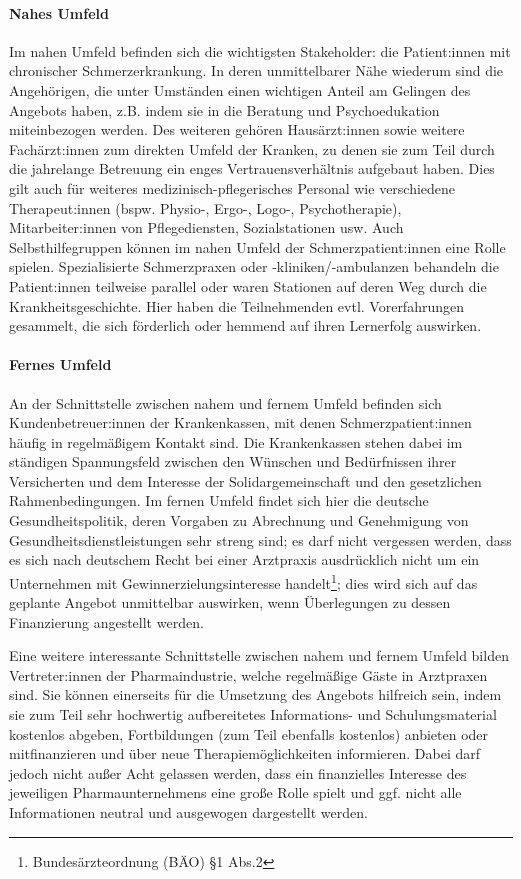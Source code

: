 \documentclass[
  twoside,
  parskip=half-,
]{scrreprt}
\begin{document}
\begin{praxis}
\paragraph{Nahes Umfeld} Im nahen Umfeld befinden sich die wichtigsten Stakeholder: die Patient:innen mit chronischer Schmerzerkrankung. In deren unmittelbarer Nähe wiederum sind die Angehörigen, die unter Umständen einen wichtigen Anteil am Gelingen des Angebots haben, z.B. indem sie in die Beratung und Psychoedukation miteinbezogen werden. Des weiteren gehören Hausärzt:innen sowie weitere Fachärzt:innen zum direkten Umfeld der Kranken, zu denen sie zum Teil durch die jahrelange Betreuung ein enges Vertrauensverhältnis aufgebaut haben. Dies gilt auch für weiteres medizinisch-pflegerisches Personal wie verschiedene Therapeut:innen (bspw. Physio-, Ergo-, Logo-, Psychotherapie), Mitarbeiter:innen von Pflegediensten, Sozialstationen usw. Auch Selbsthilfegruppen können im nahen Umfeld der Schmerzpatient:innen eine Rolle spielen. Spezialisierte Schmerzpraxen oder -kliniken/-ambulanzen behandeln die Patient:innen teilweise parallel oder waren Stationen auf deren Weg durch die Krankheitsgeschichte. Hier haben die Teilnehmenden evtl. Vorerfahrungen gesammelt, die sich förderlich oder hemmend auf ihren Lernerfolg auswirken.

\paragraph{Fernes Umfeld} An der Schnittstelle zwischen nahem und fernem Umfeld befinden sich Kundenbetreuer:innen der Krankenkassen, mit denen Schmerzpatient:innen häufig in regelmäßigem Kontakt sind. Die Krankenkassen stehen dabei im ständigen Spannungsfeld zwischen den Wünschen und Bedürfnissen ihrer Versicherten und dem Interesse der Solidargemeinschaft und den gesetzlichen Rahmenbedingungen. Im fernen Umfeld findet sich hier die deutsche Gesundheitspolitik, deren Vorgaben zu Abrechnung und Genehmigung von Gesundheitsdienstleistungen sehr streng sind; es darf nicht vergessen werden, dass es sich nach deutschem Recht bei einer Arztpraxis ausdrücklich nicht um ein Unternehmen mit Gewinnerzielungsinteresse handelt\footnote{Bundesärzteordnung (BÄO) §1 Abs.2}; dies wird sich auf das geplante Angebot unmittelbar auswirken, wenn Überlegungen zu dessen Finanzierung angestellt werden. 

Eine weitere interessante Schnittstelle zwischen nahem und fernem Umfeld bilden Vertreter:innen der Pharmaindustrie, welche regelmäßige Gäste in Arztpraxen sind. Sie können einerseits für die Umsetzung des Angebots hilfreich sein, indem sie zum Teil sehr hochwertig aufbereitetes Informations- und Schulungsmaterial kostenlos abgeben, Fortbildungen (zum Teil ebenfalls kostenlos) anbieten oder mitfinanzieren und über neue Therapiemöglichkeiten informieren. Dabei darf jedoch nicht außer Acht gelassen werden, dass ein finanzielles Interesse des jeweiligen Pharmaunternehmens eine große Rolle spielt und ggf. nicht alle Informationen neutral und ausgewogen dargestellt werden. 
\end{praxis}
\end{document}
